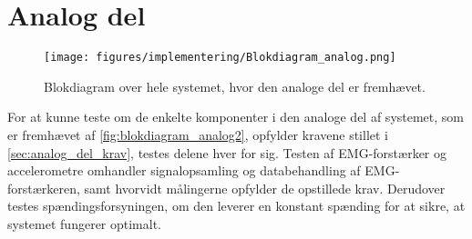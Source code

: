 \section{Analog del}
\begin{figure}[H]
\centering
\texttt{[image: figures/implementering/Blokdiagram\_analog.png]}
\caption{Blokdiagram over hele systemet, hvor den analoge del er fremhævet.}
\label{fig:blokdiagram_analog2}
\end{figure}


For at kunne teste om de enkelte komponenter i den analoge del af systemet, som er fremhævet af \autoref{fig:blokdiagram_analog2}, opfylder kravene stillet i \autoref{sec:analog_del_krav}, testes delene hver for sig. 
Testen af EMG-forstærker og accelerometre omhandler signalopsamling og databehandling af EMG-forstærkeren, samt hvorvidt målingerne opfylder de opstillede krav. 
Derudover testes spændingsforsyningen, om den leverer en konstant spænding for at sikre, at systemet fungerer optimalt. 
